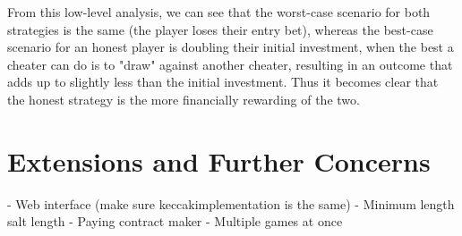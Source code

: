 \documentclass[a4paper, twoside]{article}
\begin{document}
From this low-level analysis, we can see that the worst-case scenario for both strategies is the same (the player loses their entry bet), whereas the best-case scenario for an honest player is doubling their initial investment, when the best a cheater can do is to "draw" against another cheater, resulting in an outcome that adds up to slightly less than the initial investment. Thus it becomes clear that the honest strategy is the more financially rewarding of the two.

\section{Extensions and Further Concerns}
	- Web interface (make sure keccakimplementation is the same)
	- Minimum length salt length
	- Paying contract maker
	- Multiple games at once
	




%
%

%
%


%
%
\end{document}
